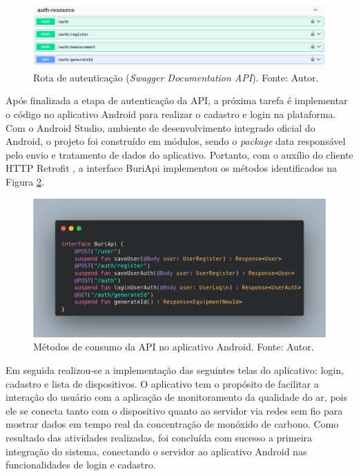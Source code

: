 \begin{figure}[ht]
    \centering
    \includegraphics[width=.74\textwidth]{img/swagger-auth-resource.png}
    \caption{Rota de autenticação (\textit{Swagger Documentation API}). Fonte: Autor.}\label{figSwaggerAut}
\end{figure}

Após finalizada a etapa de autenticação da API, a próxima tarefa é implementar o código no aplicativo Android 
para realizar o cadastro e login na plataforma. Com o Android Studio, ambiente de desenvolvimento integrado oficial do Android, o projeto 
foi construído em módulos, sendo o \textit{package} data responsável pelo envio e tratamento de dados do aplicativo. Portanto, com o auxílio do cliente HTTP Retrofit \cite{retrofit}, 
a interface BuriApi implementou os métodos identificados na Figura \ref{figRetrofitAndroid}.

\begin{figure}[ht]
    \centering
    \includegraphics[width=.74\textwidth]{img/retrofit-buri-api-auth.png}
    \caption{Métodos de consumo da API no aplicativo Android. Fonte: Autor.}\label{figRetrofitAndroid}
\end{figure}

Em seguida realizou-se a implementação das seguintes telas do aplicativo: login, cadastro e lista de dispositivos. O aplicativo 
tem o propósito de facilitar a interação do usuário com a aplicação de monitoramento da qualidade do ar, pois ele se conecta 
tanto com o dispositivo quanto ao servidor via redes sem fio para mostrar dados em tempo real da concentração de monóxido de carbono. Como resultado das 
atividades realizadas, foi concluída com sucesso a primeira integração do sistema, conectando o servidor ao aplicativo Android nas 
funcionalidades de login e cadastro. 

